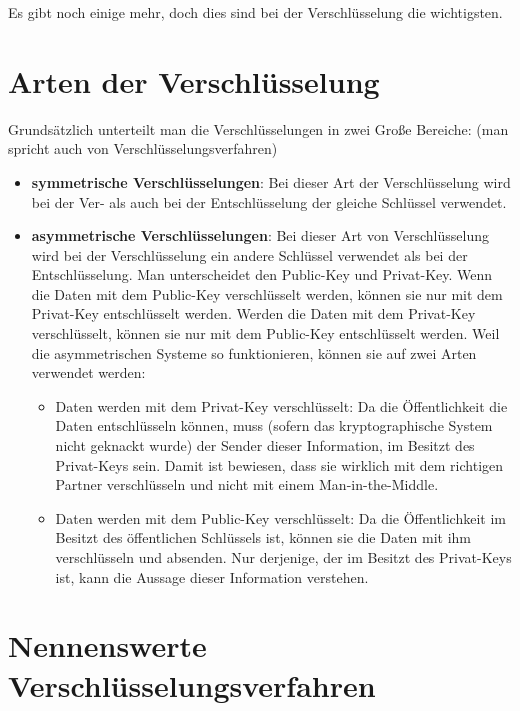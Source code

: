 Es gibt noch einige mehr, doch dies sind bei der Verschlüsselung die wichtigsten.

\section{Arten der Verschlüsselung}

Grundsätzlich unterteilt man die Verschlüsselungen in zwei Große Bereiche: (man spricht auch von Verschlüsselungsverfahren)

\begin{itemize}
\item \textbf{symmetrische Verschlüsselungen}: Bei dieser Art der Verschlüsselung wird bei der Ver- als auch bei der Entschlüsselung der gleiche Schlüssel verwendet.
\item \textbf{asymmetrische Verschlüsselungen}: Bei dieser Art von Verschlüsselung wird bei der Verschlüsselung ein andere Schlüssel verwendet als bei der Entschlüsselung. Man unterscheidet den Public-Key und Privat-Key. Wenn die Daten mit dem Public-Key verschlüsselt werden, können sie nur mit dem Privat-Key entschlüsselt werden. Werden die Daten mit dem Privat-Key verschlüsselt, können sie nur mit dem Public-Key entschlüsselt werden. Weil die asymmetrischen Systeme so funktionieren, können sie auf zwei Arten verwendet werden:

  \begin{itemize}
	\item Daten werden mit dem Privat-Key verschlüsselt: Da die Öffentlichkeit die Daten entschlüsseln können, muss (sofern das kryptographische System nicht geknackt wurde) der Sender dieser Information, im Besitzt des Privat-Keys sein. Damit ist bewiesen, dass sie wirklich mit dem richtigen Partner verschlüsseln und nicht mit einem Man-in-the-Middle.
	\item Daten werden mit dem Public-Key verschlüsselt: Da die Öffentlichkeit im Besitzt des öffentlichen Schlüssels ist, können sie die Daten mit ihm verschlüsseln und absenden. Nur derjenige, der im Besitzt des Privat-Keys ist, kann die Aussage dieser Information verstehen.
  \end{itemize}
  
\end{itemize}

\section{Nennenswerte Verschlüsselungsverfahren}

